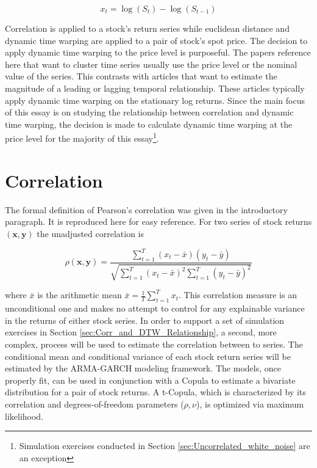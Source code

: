 \documentclass[12pt]{report}
\begin{document}
\begin{equation} \label{eq:log_return_def}
    x_{t} = \log \left(S_{t}\right) - \log\left(S_{t-1}\right)
\end{equation}

 Correlation is applied to a stock's return series while euclidean distance and dynamic time warping are applied to a pair of stock's spot price. The decision to apply dynamic time warping to the price level is purposeful. The papers reference here that want to cluster time series usually use the price level or the nominal value of the series. This contrasts with articles that want to estimate the magnitude of a leading or lagging temporal relationship. These articles typically apply dynamic time warping on the stationary log returns. Since the main focus of this essay is on studying the relationship between correlation and dynamic time warping, the decision is made to calculate dynamic time warping at the price level for the majority of this essay\footnote{Simulation exercises conducted in Section \ref{sec:Uncorrelated_white_noise} are an exception}.

\section{Correlation}

The formal definition of Pearson's correlation was given in the introductory paragraph. It is reproduced here for easy reference. For two series of stock returns $(\boldsymbol{x}, \boldsymbol{y})$ the unadjusted correlation is

\begin{equation} \label{eq:pearsons_rho}
\rho(\boldsymbol{x}, \boldsymbol{y}) = \frac{ \sum_{t=1}^{T} (x_{t} - \bar{x}) (y_{t} - \bar{y})}{ \sqrt{\sum_{t=1}^{T} (x_{t} - \bar{x})^{2} \sum_{t=1}^{T} (y_{t} - \bar{y})^{2}}}
\end{equation}

where $\bar{x}$ is the arithmetic mean $\bar{x} = \frac{1}{T}\sum^{T}_{t=1} x_{t}$. This correlation measure is an unconditional one and makes no attempt to control for any explainable variance in the returns of either stock series. In order to support a set of simulation exercises in Section \ref{sec:Corr_and_DTW_Relationship}, a second, more complex, process will be used to estimate the correlation between to series. The conditional mean and conditional variance of each stock return series will be estimated by the ARMA-GARCH modeling framework. The models, once properly fit, can be used in conjunction with a Copula to estimate a bivariate distribution for a pair of stock returns. A t-Copula, which is characterized by its correlation and degrees-of-freedom parameters ($\rho, \nu$), is optimized via maximum likelihood.
\end{document}
